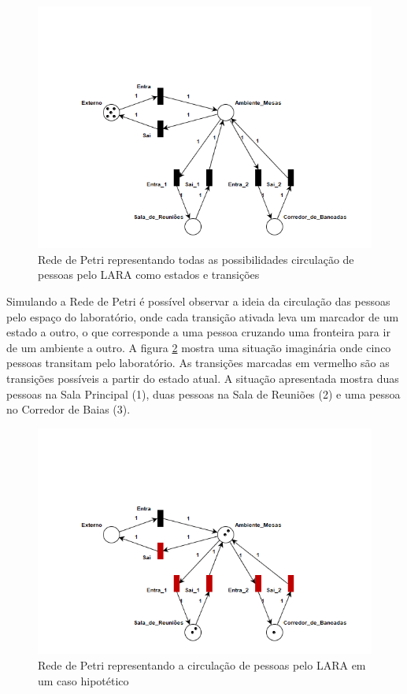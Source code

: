  \begin{figure}[h]
    \centering
    \includegraphics[width=0.8\linewidth]{figs/Metodologia/Petri_net.png}
    \caption{Rede de Petri representando todas as possibilidades circulação de pessoas pelo LARA como estados e transições}
    \label{fig:Petri1}
\end{figure}

Simulando a Rede de Petri é possível observar a ideia da circulação das pessoas pelo espaço do laboratório, onde cada transição ativada leva um marcador de um estado a outro, o que corresponde a uma pessoa cruzando uma fronteira para ir de um ambiente a outro. A figura \ref{fig:Petri2} mostra uma situação imaginária onde cinco pessoas transitam pelo laboratório. As transições marcadas em vermelho são as transições possíveis a partir do estado atual. A situação apresentada mostra duas pessoas na Sala Principal (1), duas pessoas na Sala de Reuniões (2) e uma pessoa no Corredor de Baias (3).

 \begin{figure}[h]
    \centering
    \includegraphics[width=0.8\linewidth]{figs/Metodologia/Petri_net2.png}
    \caption{Rede de Petri representando a circulação de pessoas pelo LARA em um caso hipotético}
    \label{fig:Petri2}
\end{figure}
 
